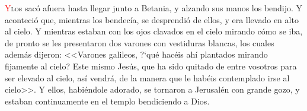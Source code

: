 \lettrine[lines=2]{\textcolor{red}{Y}} los sacó afuera hasta llegar junto a Betania, y alzando sus manos los bendijo. Y aconteció que, mientras
los bendecía, se desprendió de ellos, y era llevado en alto al cielo. Y mientras estaban con los ojos clavados en el cielo mirando cómo se iba,
de pronto se les presentaron dos varones con vestiduras blancas, los cuales además dijeron: <<Varones galileos, {?`}qué hacéis ahí plantados
mirando fijamente al cielo? Este mismo Jesús, que ha sido quitado de entre vosotros para ser elevado al cielo, así vendrá, de la manera que
le habéis contemplado irse al cielo>>. Y ellos, habiéndole adorado, se tornaron a Jerusalén con grande gozo, y estaban continuamente en 
el templo bendiciendo a Dios.